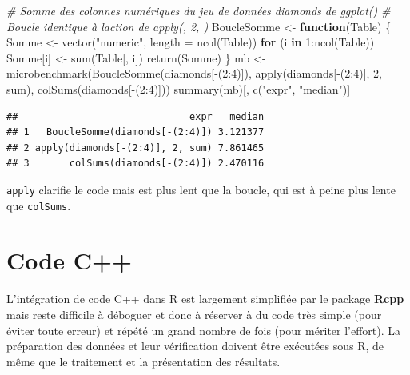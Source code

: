 \documentclass[
  11pt,
  french,
  a4paper,
  extrafontsizes,onecolumn,openright
  ]{memoir}
\newenvironment{Shaded}{\begin{snugshade}}{\end{snugshade}}
\newcommand{\AttributeTok}[1]{\textcolor[rgb]{0.77,0.63,0.00}{#1}}
\newcommand{\CommentTok}[1]{\textcolor[rgb]{0.56,0.35,0.01}{\textit{#1}}}
\newcommand{\ControlFlowTok}[1]{\textcolor[rgb]{0.13,0.29,0.53}{\textbf{#1}}}
\newcommand{\DecValTok}[1]{\textcolor[rgb]{0.00,0.00,0.81}{#1}}
\newcommand{\FunctionTok}[1]{\textcolor[rgb]{0.00,0.00,0.00}{#1}}
\newcommand{\NormalTok}[1]{#1}
\newcommand{\OtherTok}[1]{\textcolor[rgb]{0.56,0.35,0.01}{#1}}
\newcommand{\SpecialCharTok}[1]{\textcolor[rgb]{0.00,0.00,0.00}{#1}}
\newcommand{\StringTok}[1]{\textcolor[rgb]{0.31,0.60,0.02}{#1}}
\begin{document}
\begin{Shaded}
\begin{Highlighting}[]
\CommentTok{\# Somme des colonnes numériques du jeu de données diamonds de ggplot()}
\CommentTok{\# Boucle identique à l\textquotesingle{}action de apply(, 2, )}
\NormalTok{BoucleSomme }\OtherTok{\textless{}{-}} \ControlFlowTok{function}\NormalTok{(Table) \{}
\NormalTok{  Somme }\OtherTok{\textless{}{-}} \FunctionTok{vector}\NormalTok{(}\StringTok{"numeric"}\NormalTok{, }\AttributeTok{length =} \FunctionTok{ncol}\NormalTok{(Table))}
  \ControlFlowTok{for}\NormalTok{ (i }\ControlFlowTok{in} \DecValTok{1}\SpecialCharTok{:}\FunctionTok{ncol}\NormalTok{(Table)) Somme[i] }\OtherTok{\textless{}{-}} \FunctionTok{sum}\NormalTok{(Table[, i])}
  \FunctionTok{return}\NormalTok{(Somme)}
\NormalTok{\}}
\NormalTok{mb }\OtherTok{\textless{}{-}} \FunctionTok{microbenchmark}\NormalTok{(}\FunctionTok{BoucleSomme}\NormalTok{(diamonds[}\SpecialCharTok{{-}}\NormalTok{(}\DecValTok{2}\SpecialCharTok{:}\DecValTok{4}\NormalTok{)]), }
                     \FunctionTok{apply}\NormalTok{(diamonds[}\SpecialCharTok{{-}}\NormalTok{(}\DecValTok{2}\SpecialCharTok{:}\DecValTok{4}\NormalTok{)], }\DecValTok{2}\NormalTok{, sum), }
                     \FunctionTok{colSums}\NormalTok{(diamonds[}\SpecialCharTok{{-}}\NormalTok{(}\DecValTok{2}\SpecialCharTok{:}\DecValTok{4}\NormalTok{)]))}
\FunctionTok{summary}\NormalTok{(mb)[, }\FunctionTok{c}\NormalTok{(}\StringTok{"expr"}\NormalTok{, }\StringTok{"median"}\NormalTok{)]}
\end{Highlighting}
\end{Shaded}

\begin{verbatim}
##                              expr   median
## 1   BoucleSomme(diamonds[-(2:4)]) 3.121377
## 2 apply(diamonds[-(2:4)], 2, sum) 7.861465
## 3       colSums(diamonds[-(2:4)]) 2.470116
\end{verbatim}

\normalsize

\texttt{apply} clarifie le code mais est plus lent que la boucle, qui est à peine plus lente que \texttt{colSums}.

\hypertarget{sec:cpp}{%
\section{Code C++}\label{sec:cpp}}

L'intégration de code C++ dans R est largement simplifiée par le package \textbf{Rcpp} mais reste difficile à déboguer et donc à réserver à du code très simple (pour éviter toute erreur) et répété un grand nombre de fois (pour mériter l'effort).
La préparation des données et leur vérification doivent être exécutées sous R, de même que le traitement et la présentation des résultats.
\end{document}
